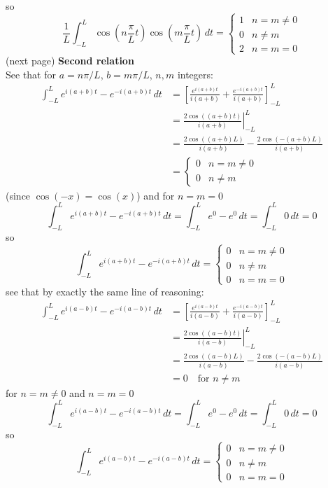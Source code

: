 \documentclass{report}
\begin{document}
so
\begin{equation*}
\frac{1}{L}\int^L_{-L}\cos\left(n\frac{\pi}{L}t\right)\cos\left(m\frac{\pi}{L}t\right)\,dt=\begin{cases}
1&n=m\neq0\\
0&n\neq m\\
2&n=m=0
\end{cases}
\end{equation*}
(next page)
\newpage
\noindent\textbf{Second relation}\\
See that for $a=n\pi/L$, $b=m\pi/L$, $n,m$ integers:
\begin{align*}
\int^L_{-L}e^{i(a+b)t}-e^{-i(a+b)t}\,dt&=
\left[\frac{e^{i(a+b)t}}{i(a+b)}+\frac{e^{-i(a+b)t}}{i(a+b)}\right]^L_{-L}\\
&=\left.\frac{2\cos((a+b)t)}{i(a+b)}\right|^L_{-L}\\
&=\frac{2\cos((a+b)L)}{i(a+b)}-\frac{2\cos(-(a+b)L)}{i(a+b)}\\
&=\begin{cases}
0&n=m\neq0\\
0&n\neq m
\end{cases}
\end{align*}
(since $\cos(-x)=\cos(x)$) and for $n=m=0$
\begin{equation*}
\int^L_{-L}e^{i(a+b)t}-e^{-i(a+b)t}\,dt=\int^L_{-L}e^{0}-e^{0}\,dt=\int^L_{-L}0\,dt=0
\end{equation*}
so
\begin{equation*}
\int^L_{-L}e^{i(a+b)t}-e^{-i(a+b)t}\,dt=\begin{cases}
0&n=m\neq0\\
0&n\neq m\\
0&n=m=0
\end{cases}
\end{equation*}
see that by exactly the same line of reasoning:
\begin{align*}
\int^L_{-L}e^{i(a-b)t}-e^{-i(a-b)t}\,dt&=
\left[\frac{e^{i(a-b)t}}{i(a-b)}+\frac{e^{-i(a-b)t}}{i(a-b)}\right]^L_{-L}\\
&=\left.\frac{2\cos((a-b)t)}{i(a-b)}\right|^L_{-L}\\
&=\frac{2\cos((a-b)L)}{i(a-b)}-\frac{2\cos(-(a-b)L)}{i(a-b)}\\
&=0\quad\text{for }n\neq m
\end{align*}
for $n=m\neq0$ and $n=m=0$
\begin{equation*}
\int^L_{-L}e^{i(a-b)t}-e^{-i(a-b)t}\,dt=\int^L_{-L}e^{0}-e^{0}\,dt=\int^L_{-L}0\,dt=0
\end{equation*}
so
\begin{equation*}
\int^L_{-L}e^{i(a-b)t}-e^{-i(a-b)t}\,dt=\begin{cases}
0&n=m\neq0\\
0&n\neq m\\
0&n=m=0
\end{cases}
\end{equation*}
\end{document}
